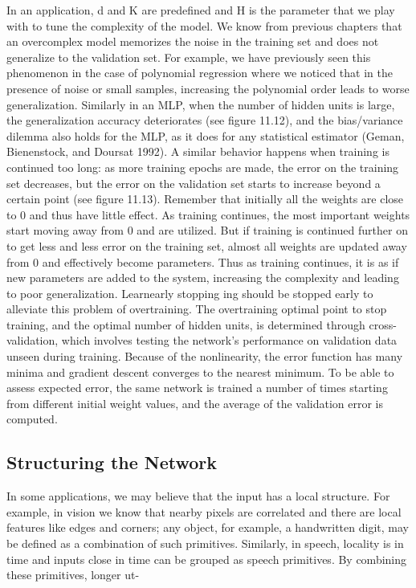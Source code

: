 In an application, d and K are predefined and H is the parameter that we play with to tune the complexity of the model. We know from previous chapters that an overcomplex model memorizes the noise in the training set and does not generalize to the validation set. For example, we have previously seen this phenomenon in the case of polynomial regression where we noticed that in the presence of noise or small samples, increasing the polynomial order leads to worse generalization. Similarly in an MLP, when the number of hidden units is large, the generalization accuracy deteriorates (see figure 11.12), and the bias/variance dilemma also holds for the MLP, as it does for any statistical estimator (Geman, Bienenstock, and Doursat 1992). A similar behavior happens when training is continued too long: as more training epochs are made, the error on the training set decreases, but the error on the validation set starts to increase beyond a certain point (see figure 11.13). Remember that initially all the weights are close to 0 and thus have little effect. As training continues, the most important weights start moving away from 0 and are utilized. But if training is continued further on to get less and less error on the training set, almost all weights are updated away from 0 and effectively become parameters. Thus as training continues, it is as if new parameters are added to the system, increasing the complexity and leading to poor generalization. Learnearly stopping ing should be stopped early to alleviate this problem of overtraining. The overtraining optimal point to stop training, and the optimal number of hidden units, is determined through cross-validation, which involves testing the network’s performance on validation data unseen during training. Because of the nonlinearity, the error function has many minima and gradient descent converges to the nearest minimum. To be able to assess expected error, the same network is trained a number of times starting from different initial weight values, and the average of the validation error is computed.

\subsection{Structuring the Network}

In some applications, we may believe that the input has a local structure. For example, in vision we know that nearby pixels are correlated and there are local features like edges and corners; any object, for example, a handwritten digit, may be defined as a combination of such primitives. Similarly, in speech, locality is in time and inputs close in time can be grouped as speech primitives. By combining these primitives, longer ut-

